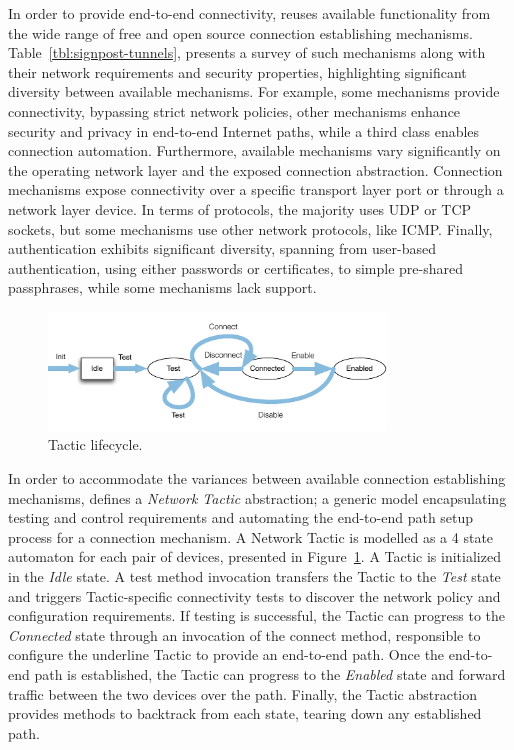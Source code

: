 In order to provide end-to-end connectivity, \signpost reuses available
functionality from the wide range of free and open source connection
establishing mechanisms. Table~\ref{tbl:signpost-tunnels}, presents a survey of
such mechanisms along with their network requirements and security properties,
highlighting significant diversity between available mechanisms.  For example,
some mechanisms provide connectivity, bypassing strict network policies,  other
mechanisms enhance security and privacy in end-to-end Internet paths, while a
third class enables connection automation.  Furthermore, available mechanisms
vary significantly on the operating network layer and the exposed connection
abstraction. Connection mechanisms expose connectivity over a specific transport
layer port or through a network layer device.  In terms of protocols, the
majority uses UDP or TCP sockets, but some mechanisms use other network
protocols, like ICMP\@.  Finally, authentication exhibits significant diversity,
spanning from user-based authentication, using either passwords or certificates,
to simple pre-shared passphrases, while some mechanisms lack support. 

\begin{figure}
  \begin{center}
	\includegraphics[width=0.8\textwidth]{signpost-tactic}
  \end{center}
  \caption{\signpost Tactic lifecycle.}
  \label{fig:signpost-tactic}
\end{figure}

In order to accommodate the variances between available connection establishing
mechanisms, \signpost defines a \textit{Network Tactic} abstraction; a generic
model encapsulating testing and control requirements and automating the
end-to-end path setup process for a connection mechanism.  A Network Tactic is
modelled as a 4 state automaton for each pair of devices, presented in
Figure~\ref{fig:signpost-tactic}.  A Tactic is initialized in the \emph{Idle}
state.  A test method invocation transfers the Tactic to the \emph{Test} state
and triggers Tactic-specific connectivity tests to discover the network policy
and configuration requirements.  If testing is successful, the Tactic can
progress to the \emph{Connected} state through an invocation of the connect
method, responsible to configure the underline Tactic to provide an end-to-end
path. Once the end-to-end path is established, the Tactic can progress to the
\emph{Enabled} state and forward traffic between the two devices over the path.
Finally, the Tactic abstraction provides methods to backtrack from each state,
tearing down any established path. 

